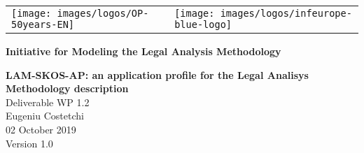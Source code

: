 
\newcommand{\DelTitle}{LAM-SKOS-AP: an application profile for the Legal Analisys Methodology description}
\newcommand{\DelNumber}{WP 1.2}
\newcommand{\DelVersion}{1.0}
\newcommand{\DelAuthor}{Eugeniu Costetchi}
\newcommand{\DelDate}{02 October 2019}
\newcommand{\DelFilename}{wp1-2-lam-skos-ap}


\pagestyle{empty}
\graphicspath{{figures/}}

\begin{titlepage}
\begin{center}

\begin{center}
	\begin{center}
		\setlength{\tabcolsep}{0pt}
		\begin{tabular}{>{\raggedleft}m{3.5cm}>{\centering}m{\dimexpr\textwidth - 8cm\relax}>{\raggedright}m{3.5cm}}
			\texttt{[image: images/logos/OP-50years-EN]}%
			&%
			&%
			\texttt{[image: images/logos/infeurope-blue-logo]} %
		\end{tabular}
	\end{center}


  \vspace{2mm}

  \end{center}
  \vspace{4cm}
  \textbf{{\large Initiative for Modeling the Legal Analysis Methodology\\}}
  \vspace{2cm}
  
  \begin{spacing}{2.5}
    \textbf{\Huge \DelTitle}\\ \vspace{2cm}
    {\large Deliverable \DelNumber} \\ %
	{\large \DelAuthor} \\ %
	{\large \DelDate} \\ %
    {\large Version \DelVersion}
  \end{spacing}
  
  \vspace*{\fill}


\end{center}
\end{titlepage}

